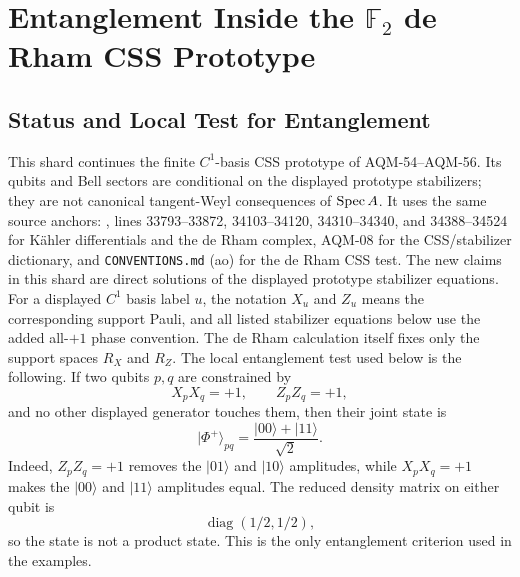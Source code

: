 \section{Entanglement Inside the \texorpdfstring{\(\mathbb F_2\)}{F2} de Rham CSS Prototype}
\label{sec:derham-css-f2-entanglement-codes}
\subsection{Status and Local Test for Entanglement}
This shard continues the finite \(C^1\)-basis CSS prototype of AQM-54--AQM-56.
Its qubits and Bell sectors are conditional on the displayed prototype
stabilizers; they are not canonical tangent-Weyl consequences of
\(\operatorname{Spec} A\).  It uses the same source anchors:
, lines
33793--33872, 34103--34120, 34310--34340, and 34388--34524 for K\"ahler
differentials and the de Rham complex, AQM-08 for the CSS/stabilizer
dictionary, and \texttt{CONVENTIONS.md} (ao) for the de Rham CSS test.  The new
claims in this shard are direct solutions of the displayed prototype
stabilizer equations.  For a displayed \(C^1\) basis label \(u\), the notation
\(X_u\) and \(Z_u\) means the corresponding support Pauli, and all listed
stabilizer equations below use the added all-\(+1\) phase convention.  The
de Rham calculation itself fixes only the support spaces \(R_X\) and \(R_Z\).
The local entanglement test used below is the following.  If two qubits \(p,q\)
are constrained by
\[
  X_pX_q=+1,\qquad Z_pZ_q=+1,
\]
and no other displayed generator touches them, then their joint state is
\[
  |\Phi^+\rangle_{pq}=\frac{|00\rangle+|11\rangle}{\sqrt2}.
\]
Indeed, \(Z_pZ_q=+1\) removes the \(|01\rangle\) and \(|10\rangle\)
amplitudes, while \(X_pX_q=+1\) makes the \(|00\rangle\) and \(|11\rangle\)
amplitudes equal.  The reduced density matrix on either qubit is
\[
  \operatorname{diag}(1/2,1/2),
\]
so the state is not a product state.  This is the only entanglement criterion
used in the examples.
